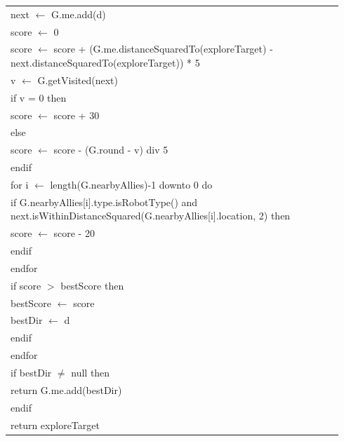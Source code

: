 \documentclass{article}
\newenvironment{pseudobox}
{
\centering
\begin{longtable}{|p{0.94\linewidth}|}
\hline
}
{
\\ \hline
\end{longtable}
\vspace{0.05cm}
}
\begin{document}
\begin{pseudobox}
\hspace*{2em} next $\leftarrow$ G.me.add(d) \\
\hspace*{2em} score $\leftarrow$ 0 \\

\hspace*{2em} score $\leftarrow$ score + (G.me.distanceSquaredTo(exploreTarget) - next.distanceSquaredTo(exploreTarget)) * 5 \\

\hspace*{2em} v $\leftarrow$ G.getVisited(next) \\
\hspace*{2em} if v = 0 then \\
\hspace*{3em} score $\leftarrow$ score + 30 \\
\hspace*{2em} else \\
\hspace*{3em} score $\leftarrow$ score - (G.round - v) div 5 \\
\hspace*{2em} endif \\

\hspace*{2em} for i $\leftarrow$ length(G.nearbyAllies)-1 downto 0 do \\
\hspace*{3em} if G.nearbyAllies[i].type.isRobotType() and next.isWithinDistanceSquared(G.nearbyAllies[i].location, 2) then \\
\hspace*{4em} score $\leftarrow$ score - 20 \\
\hspace*{3em} endif \\
\hspace*{2em} endfor \\

\hspace*{2em} if score $>$ bestScore then \\
\hspace*{3em} bestScore $\leftarrow$ score \\
\hspace*{3em} bestDir $\leftarrow$ d \\
\hspace*{2em} endif \\
\hspace*{1em} endfor \\

\hspace*{1em} if bestDir $\neq$ null then \\
\hspace*{2em} return G.me.add(bestDir) \\
\hspace*{1em} endif \\

\hspace*{1em} return exploreTarget
\end{pseudobox}
\end{document}
